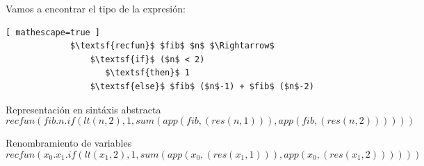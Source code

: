 \bigskip
\bigskip


    \begin{exercise}
        Vamos a encontrar el tipo de la expresión:
            \begin{lstlisting}[ mathescape=true ]
             $\textsf{recfun}$ $fib$ $n$ $\Rightarrow$ 
                 $\textsf{if}$ ($n$ < 2) 
                    $\textsf{then}$ 1
                 $\textsf{else}$ $fib$ ($n$-1) + $fib$ ($n$-2)
           \end{lstlisting}
        \begin{description}
	 \item Representación en sintáxis abstracta	
 	        $$recfun(fib.n.if(lt(n , 2), 1, sum(app(fib, (res(n,1))),app(fib, (res(n,2))))))$$

            \item Renombramiento de variables
                $$recfun(x_0.x_1.if(lt(x_1 , 2), 1, sum(app(x_0, (res(x_1,1))), app(x_0, (res(x_1,2))))))$$


\end{description}
\end{exercise}
